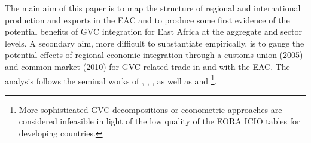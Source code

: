 \documentclass[a4paper]{article}
\begin{document}
The main aim of this paper is to map the structure of regional and international production and exports in the EAC and to produce some first evidence of the potential benefits of GVC integration for East Africa at the aggregate and sector levels. A secondary aim, more difficult to substantiate empirically, is to gauge the potential effects of regional economic integration through a customs union (2005) and common market (2010) for GVC-related trade in and with the EAC. The analysis follows the seminal works of \citet{hummels2001nature}, \citet{koopman2014tracing}, \citet{wang2013quantifying}, as well as \citet{Kummritz20161} and \citet{Kummritz20162}\footnote{More sophisticated GVC decompositions or econometric approaches are considered infeasible in light of the low quality of the EORA ICIO tables for developing countries.}. \newline 
\end{document}
